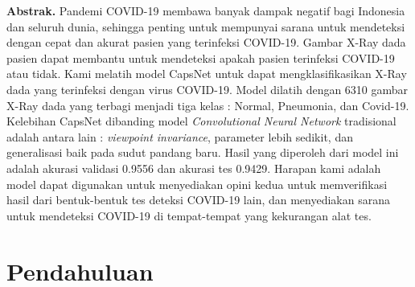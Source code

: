 \documentclass{article}
\begin{document}
  \newpage
  \textbf{Abstrak.} Pandemi COVID-19 membawa banyak dampak negatif bagi Indonesia dan seluruh dunia, sehingga penting untuk mempunyai sarana untuk mendeteksi dengan cepat dan akurat pasien yang terinfeksi COVID-19. Gambar X-Ray dada pasien dapat membantu untuk mendeteksi apakah pasien terinfeksi COVID-19 atau tidak. Kami melatih model CapsNet untuk dapat mengklasifikasikan X-Ray dada yang terinfeksi dengan virus COVID-19. Model dilatih dengan 6310 gambar X-Ray dada yang terbagi menjadi tiga kelas : Normal, Pneumonia, dan Covid-19. Kelebihan CapsNet dibanding model \textit{Convolutional Neural Network} tradisional adalah antara lain : \textit{viewpoint invariance}, parameter lebih sedikit, dan generalisasi baik pada sudut pandang baru. Hasil yang diperoleh dari model ini adalah akurasi validasi 0.9556 dan akurasi tes 0.9429. Harapan kami adalah model dapat digunakan untuk menyediakan opini kedua untuk memverifikasi hasil dari bentuk-bentuk tes deteksi COVID-19 lain, dan menyediakan sarana untuk mendeteksi COVID-19 di tempat-tempat yang kekurangan alat tes.
  \newpage
  \tableofcontents
  \newpage
  \section{Pendahuluan}
\end{document}
